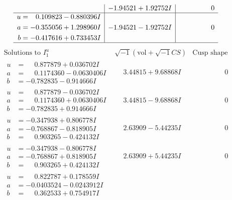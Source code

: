 \documentclass[1p]{elsarticle_modified}
\theoremstyle{definition}
\newcommand{\I}{\sqrt{-1}}
\begin{document}
$$\begin{array}{c|c|c}
 & -1.94521 + 1.92752 I & \phantom{-0.000000 } 0 \\ \hline\begin{aligned}
u &= \phantom{-}0.109823 - 0.880396 I \\
a &= -0.355056 + 1.298960 I \\
b &= -0.417616 + 0.733453 I\end{aligned}
 & -1.94521 - 1.92752 I & \phantom{-0.000000 } 0\\
 \hline 
 \end{array}$$\newpage$$\begin{array}{c|c|c}  
\text{Solutions to }I^u_{1}& \I (\text{vol} + \sqrt{-1}CS) & \text{Cusp shape}\\
 \hline 
\begin{aligned}
u &= \phantom{-}0.877879 + 0.036702 I \\
a &= \phantom{-}0.1174360 - 0.0630406 I \\
b &= -0.782835 - 0.914666 I\end{aligned}
 & \phantom{-}3.44815 + 9.68868 I & \phantom{-0.000000 } 0 \\ \hline\begin{aligned}
u &= \phantom{-}0.877879 - 0.036702 I \\
a &= \phantom{-}0.1174360 + 0.0630406 I \\
b &= -0.782835 + 0.914666 I\end{aligned}
 & \phantom{-}3.44815 - 9.68868 I & \phantom{-0.000000 } 0 \\ \hline\begin{aligned}
u &= -0.347938 + 0.806778 I \\
a &= -0.768867 - 0.818905 I \\
b &= \phantom{-}0.903265 - 0.424132 I\end{aligned}
 & \phantom{-}2.63909 - 5.44235 I & \phantom{-0.000000 } 0 \\ \hline\begin{aligned}
u &= -0.347938 - 0.806778 I \\
a &= -0.768867 + 0.818905 I \\
b &= \phantom{-}0.903265 + 0.424132 I\end{aligned}
 & \phantom{-}2.63909 + 5.44235 I & \phantom{-0.000000 } 0 \\ \hline\begin{aligned}
u &= \phantom{-}0.822787 + 0.178559 I \\
a &= -0.0403524 - 0.0243912 I \\
b &= \phantom{-}0.362533 + 0.754917 I\end{aligned}

\end{array}$$
\end{document}
